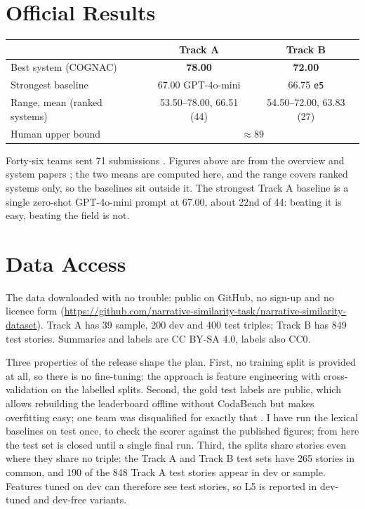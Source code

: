 \documentclass[11pt,letterpaper]{article}
\begin{document}
\section{Official Results}

\begin{center}
\small\begin{tabular}{lcc}
\toprule
& \textbf{Track A} & \textbf{Track B} \\
\midrule
Best system (COGNAC) & \textbf{78.00} & \textbf{72.00} \\
Strongest baseline & 67.00 \scriptsize GPT-4o-mini & 66.75 \scriptsize \texttt{e5} \\
Range, mean (ranked systems) & 53.50--78.00, 66.51 (44) & 54.50--72.00, 63.83 (27) \\
Human upper bound & \multicolumn{2}{c}{$\approx 89$} \\
\bottomrule
\end{tabular}
\end{center}

Forty-six teams sent 71 submissions \cite{hatzel2026}. Figures above are from the overview and system papers
\cite{hatzel2026,cognac,e5}; the two means are computed here, and the range covers ranked systems only,
so the baselines sit outside it. The strongest Track A baseline is a single zero-shot GPT-4o-mini prompt at
67.00, about 22nd of 44: beating it is easy, beating the field is not.

\section{Data Access}

The data downloaded with no trouble: public on GitHub, no sign-up and no licence form
(\url{https://github.com/narrative-similarity-task/narrative-similarity-dataset}). Track A has 39 sample, 200 dev
and 400 test triples; Track B has 849 test stories. Summaries and labels are CC BY-SA 4.0, labels also CC0.

Three properties of the release shape the plan. First, no training split is provided at all, so there is no
fine-tuning: the approach is feature engineering with cross-validation on the labelled splits. Second, the gold
test labels are public, which allows rebuilding the leaderboard offline without CodaBench but makes overfitting
easy; one team was disqualified for exactly that \cite{hatzel2026}. I have run the lexical baselines on test
once, to check the scorer against the published figures; from here the test set is closed until a single final
run. Third, the
splits share stories even where they share no triple: the Track A and Track B test sets have 265 stories in
common, and 190 of the 848 Track A test stories appear in dev or sample. Features tuned on dev
can therefore see test stories, so L5 is reported in dev-tuned and dev-free variants.
\end{document}
